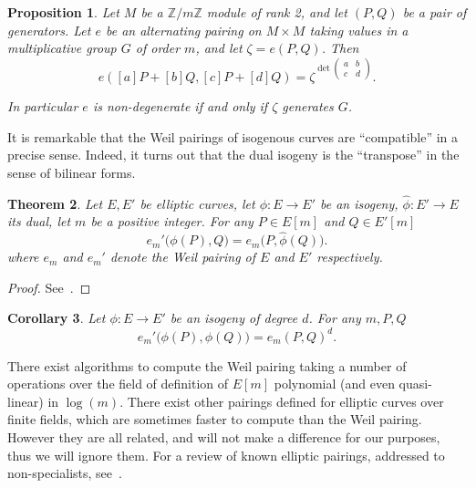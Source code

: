 \documentclass[10pt]{article}
\theoremstyle{plain}
\newtheorem{theorem}{Theorem}
\newtheorem{corollary}[theorem]{Corollary}
\newtheorem{proposition}[theorem]{Proposition}
\theoremstyle{definition}
\begin{document}
\begin{proposition}
  \label{prop:weil-det}
  Let $M$ be a $ℤ/mℤ$ module of rank 2, and let $(P,Q)$ be a pair of
  generators. %
  Let $e$ be an alternating pairing on $M×M$ taking values in a
  multiplicative group $G$ of order $m$, and let $\zeta = e(P,Q)$. %
  Then
  \[e([a]P + [b]Q, [c]P + [d]Q) =
    \zeta^{\det\left(\begin{smallmatrix}a&b\\c&d\end{smallmatrix}\right)}.\]

  In particular $e$ is non-degenerate if and only if $\zeta$ generates $G$.
\end{proposition}

It is remarkable that the Weil pairings of isogenous curves are
``compatible'' in a precise sense. %
Indeed, it turns out that the dual isogeny is the ``transpose'' in the
sense of bilinear forms.

\begin{theorem}
  Let $E,E'$ be elliptic curves, let $\phi:E\to E'$ be an isogeny,
  $\hat\phi:E'\to E$ its dual, let $m$ be a positive integer. %
  For any $P\in E[m]$ and $Q\in E'[m]$
  \begin{equation}
    \label{eq:pairing-isog}
    e_m'\bigl(\phi(P), Q\bigr) = e_m\bigl(P, \hat\phi(Q)\bigr).
  \end{equation}
  where $e_m$ and $e_m'$ denote the Weil pairing of $E$ and $E'$
  respectively.
\end{theorem}
\begin{proof}
  See~\cite[III.8.2]{silverman:elliptic}.
\end{proof}

\begin{corollary}
  \label{coro:iso-pairing}
  Let $\phi:E\to E'$ be an isogeny of degree $d$. For any
  $m,P,Q$
  \[e_m'\bigl(\phi(P),\phi(Q)\bigr) = e_m(P,Q)^d.\]
\end{corollary}

There exist algorithms to compute the Weil pairing taking a number of
operations over the field of definition of $E[m]$ polynomial (and even
quasi-linear) in $\log(m)$. %
There exist other pairings defined for elliptic curves over finite
fields, which are sometimes faster to compute than the Weil pairing. %
However they are all related, and will not make a difference for our
purposes, thus we will ignore them. %
For a review of known elliptic pairings, addressed to non-specialists,
see~\cite{10.1016/j.dam.2007.12.010}.
\end{document}
